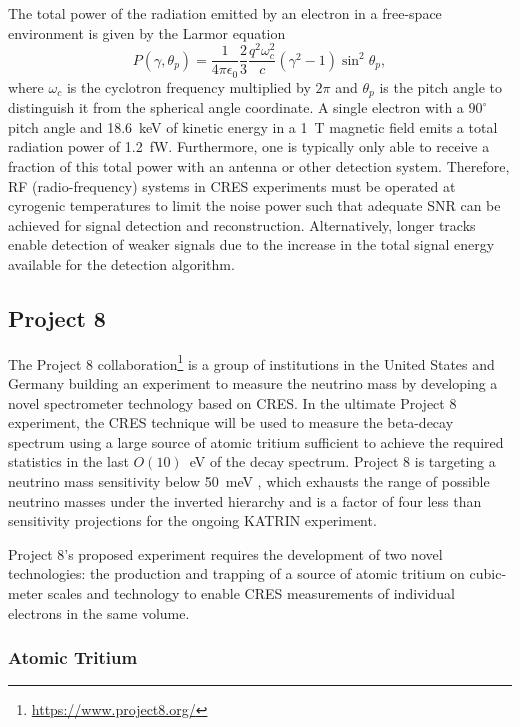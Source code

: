 The total power of the radiation emitted by an electron in a free-space environment is given by the Larmor equation \cite{larmor_eqn}
\begin{equation}
    P(\gamma, \theta_p)=\frac{1}{4\pi\epsilon_0}\frac{2}{3}\frac{q^2\omega_c^2}{c}(\gamma^2 - 1)\sin^2{\theta_p},
\end{equation}
where $\omega_c$ is the cyclotron frequency multiplied by $2\pi$ and $\theta_p$ is the pitch angle to distinguish it from the spherical angle coordinate. A single electron with a $90^\circ$ pitch angle and 18.6~keV of kinetic energy in a 1~T magnetic field emits a total radiation power of 1.2~fW. Furthermore, one is typically only able to receive a fraction of this total power with an antenna or other detection system. Therefore, RF (radio-frequency) systems in CRES experiments must be operated at cyrogenic temperatures to limit the noise power such that adequate SNR can be achieved for signal detection and reconstruction. Alternatively, longer tracks enable detection of weaker signals due to the increase in the total signal energy available for the detection algorithm.

\subsection{Project 8}

The Project 8 collaboration\footnote{\url{https://www.project8.org/}} is a group of institutions in the United States and Germany building an experiment to measure the neutrino mass by developing a novel spectrometer technology based on CRES. In the ultimate Project 8 experiment, the CRES technique will be used to measure the beta-decay spectrum using a large source of atomic tritium sufficient to achieve the required statistics in the last $O(10)$~eV of the decay spectrum. Project 8 is targeting a neutrino mass sensitivity below 50~meV \cite{p8snomass}, which exhausts the range of possible neutrino masses under the inverted hierarchy and is a factor of four less than sensitivity projections for the ongoing KATRIN experiment.

Project 8's proposed experiment requires the development of two novel technologies: the production and trapping of a source of atomic tritium on cubic-meter scales and technology to enable CRES measurements of individual electrons in the same volume. 

\subsubsection*{Atomic Tritium}

